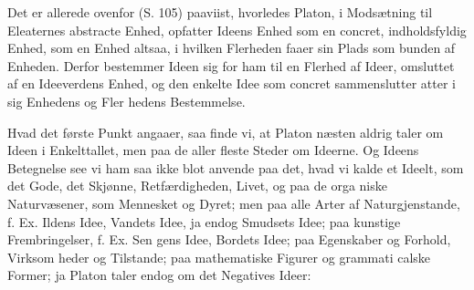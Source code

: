 \documentclass[12pt,a4paper]{book}
\begin{document}
Det er allerede ovenfor (S. 105) paaviist, hvorledes Platon,
i Modsætning til Eleaternes abstracte Enhed, opfatter Ideens
Enhed som en concret, indholdsfyldig Enhed, som en Enhed
altsaa, i hvilken Flerheden faaer sin Plads som bunden af
Enheden. Derfor bestemmer Ideen sig for ham til en Flerhed
af Ideer, omsluttet af en Ideeverdens Enhed, og den enkelte
Idee som concret sammenslutter atter i sig Enhedens og Fler\-%
hedens Bestemmelse.

Hvad det første Punkt angaaer, saa finde vi, at Platon
næsten aldrig taler om Ideen i Enkelttallet, men paa de aller\-%
fleste Steder om Ideerne. Og Ideens Betegnelse see vi ham
saa ikke blot anvende paa det, hvad vi kalde et Ideelt, som
det Gode, det Skjønne, Retfærdigheden, Livet, og paa de orga\-%
niske Naturvæsener, som Mennesket og Dyret; men paa alle
Arter af Naturgjenstande, f. Ex. Ildens Idee, Vandets Idee, ja
endog Smudsets Idee; paa kunstige Frembringelser, f. Ex. Sen\-%
gens Idee, Bordets Idee; paa Egenskaber og Forhold, Virksom\-%
heder og Tilstande; paa mathematiske Figurer og grammati\-%
calske Former; ja Platon taler endog om det Negatives Ideer:
\setcounter{footnote}{0}
\end{document}
